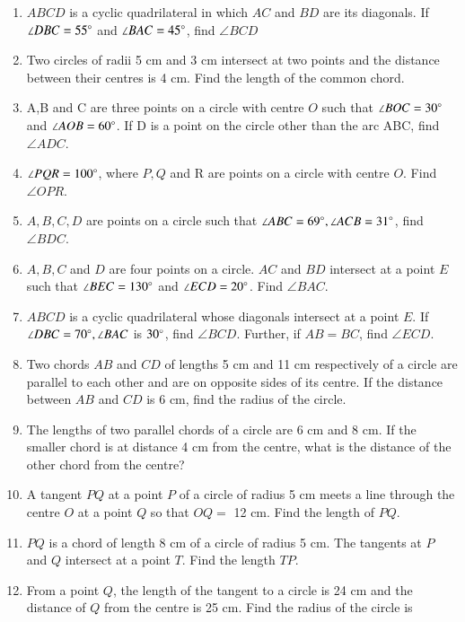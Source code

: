 \renewcommand{\theequation}{\theenumi}
\begin{enumerate}[label=\arabic*.,ref=\thesubsection.\theenumi]
\item $ABCD$ is a cyclic quadrilateral in which $AC$ and $BD$ are its diagonals. If $\angle DBC = 55\degree$ and $\angle BAC = 45\degree$, find $\angle BCD$
%
\item Two circles of radii 5 cm and 3 cm intersect at two points and the distance between their centres is 4 cm. Find the length of the common chord.
%
%
\item  A,B and C are three points on a circle with centre $O$ such that $\angle BOC = 30\degree $ and $ \angle AOB = 60\degree$. If D is a point on the circle other than the arc ABC, find $\angle ADC$.
%
\item $ \angle PQR = 100\degree$, where $P, Q$ and R are
points on a circle with centre $O$. Find $\angle OPR$.
\item $A, B, C, D$ are points on a circle such that $ \angle ABC = 69\degree, \angle ACB = 31\degree$, find
$\angle BDC$.
\item $A, B, C$ and $D$ are four points on a
circle. $AC$ and $BD$ intersect at a point $E$ such
that $\angle BEC = 130\degree$ and $\angle ECD = 20\degree$. Find $\angle BAC$.
\item $ABCD$ is a cyclic quadrilateral whose diagonals intersect at a point $E$. If $\angle DBC = 70\degree,
\angle BAC$ is $30\degree$, find $\angle BCD$. Further, if $AB = BC$, find $\angle ECD$.
%
\item Two chords $AB$ and $CD$ of lengths 5 cm and 11 cm respectively of a circle are parallel
to each other and are on opposite sides of its centre. If the distance between $AB$ and
$CD$ is 6 cm, find the radius of the circle.
\item The lengths of two parallel chords of a circle are 6 cm and 8 cm. If the smaller chord is
at distance 4 cm from the centre, what is the distance of the other chord from the
centre?
%
\item A tangent $PQ$ at a point $P$ of a circle of radius 5 cm meets a line through the centre $O$ at a point $Q$ so that $OQ =$ 12 cm. Find the length of $PQ$.
%
\item $PQ$ is a chord of length 8 cm of a circle of radius 5 cm. The tangents at $P$ and $Q$ intersect at a point $T$. Find the length $TP$.
%
\item From a point $Q$, the length of the tangent to a circle is 24 cm and the distance of $Q$ from the centre is 25 cm. Find the radius of the circle is 

\end{enumerate}
